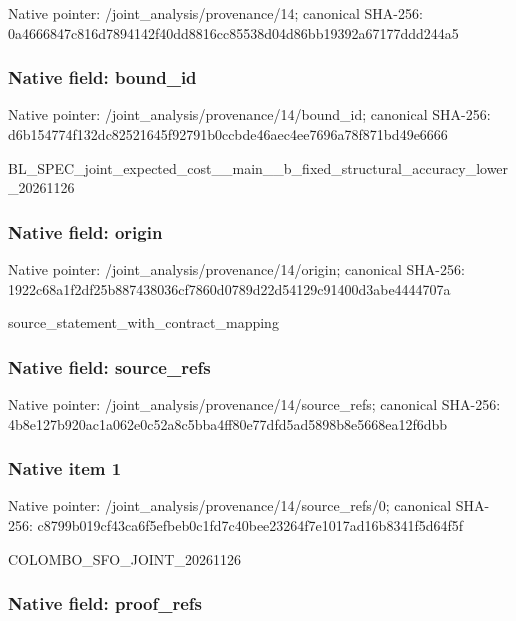 \documentclass[10pt,a4paper]{article}
\begin{document}
Native pointer: /joint\_analysis/provenance/14; canonical SHA-256: 0a4666847c816d7894142f40\allowbreak{}dd8816cc85538d04d86bb193\allowbreak{}92a67177ddd244a5



\subsubsection{Native field: bound\_id}


Native pointer: /joint\_analysis/provenance/14/bound\_id; canonical SHA-256: d6b154774f132dc82521645f\allowbreak{}92791b0ccbde46aec4ee7696\allowbreak{}a78f871bd49e6666


BL\_SPEC\_joint\_expected\_c\allowbreak{}ost\_\_main\_\_b\_fixed\_struc\allowbreak{}tural\_accuracy\_lower\_202\allowbreak{}61126


\subsubsection{Native field: origin}


Native pointer: /joint\_analysis/provenance/14/origin; canonical SHA-256: 1922c68a1f2df25b88743803\allowbreak{}6cf7860d0789d22d54129c91\allowbreak{}400d3abe4444707a


source\_statement\_with\_contract\_mapping


\subsubsection{Native field: source\_refs}


Native pointer: /joint\_analysis/provenan\allowbreak{}ce/14/source\_refs; canonical SHA-256: 4b8e127b920ac1a062e0c52a\allowbreak{}8c5bba4ff80e77dfd5ad5898\allowbreak{}b8e5668ea12f6dbb



\subsubsection{Native item 1}


Native pointer: /joint\_analysis/provenan\allowbreak{}ce/14/source\_refs/0; canonical SHA-256: c8799b019cf43ca6f5efbeb0\allowbreak{}c1fd7c40bee23264f7e1017a\allowbreak{}d16b8341f5d64f5f


COLOMBO\_SFO\_JOINT\_20261126


\subsubsection{Native field: proof\_refs}
\end{document}
